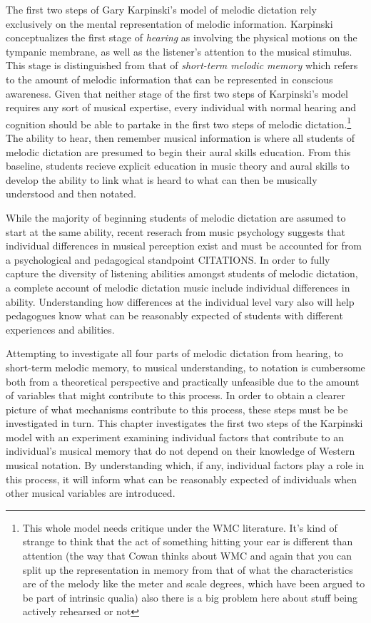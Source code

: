 \documentclass[]{book}
\let\rmarkdownfootnote\footnote%
\def\footnote{\protect\rmarkdownfootnote}
\begin{document}
The first two steps of Gary Karpinski's model of melodic dictation \citep{karpinskiAuralSkillsAcquisition2000, karpinskiModelMusicPerception1990} rely exclusively on the mental representation of melodic information.
Karpinski conceptualizes the first stage of \emph{hearing} as involving the physical motions on the tympanic membrane, as well as the listener's attention to the musical stimulus.
This stage is distinguished from that of \emph{short-term melodic memory} which refers to the amount of melodic information that can be represented in conscious awareness.
Given that neither stage of the first two steps of Karpinski's model requires any sort of musical expertise, every individual with normal hearing and cognition should be able to partake in the first two steps of melodic dictation.\footnote{This whole model needs critique under the WMC literature. It's kind of strange to think that the act of something hitting your ear is different than attention (the way that Cowan thinks about WMC and again that you can split up the representation in memory from that of what the characteristics are of the melody like the meter and scale degrees, which have been argued to be part of intrinsic qualia) also there is a big problem here about stuff being actively rehearsed or not}
The ability to hear, then remember musical information is where all students of melodic dictation are presumed to begin their aural skills education.
From this baseline, students recieve explicit education in music theory and aural skills to develop the ability to link what is heard to what can then be musically understood and then notated.

While the majority of beginning students of melodic dictation are assumed to start at the same ability, recent reserach from music psychology suggests that individual differences in musical perception exist and must be accounted for from a psychological and pedagogical standpoint CITATIONS.
In order to fully capture the diversity of listening abilities amongst students of melodic dictation, a complete account of melodic dictation music include individual differences in ability.
Understanding how differences at the individual level vary also will help pedagogues know what can be reasonably expected of students with different experiences and abilities.

Attempting to investigate all four parts of melodic dictation from hearing, to short-term melodic memory, to musical understanding, to notation is cumbersome both from a theoretical perspective and practically unfeasible due to the amount of variables that might contribute to this process.
In order to obtain a clearer picture of what mechanisms contribute to this process, these steps must be be investigated in turn.
This chapter investigates the first two steps of the Karpinski model with an experiment examining individual factors that contribute to an individual's musical memory that do not depend on their knowledge of Western musical notation.
By understanding which, if any, individual factors play a role in this process, it will inform what can be reasonably expected of individuals when other musical variables are introduced.
\end{document}
